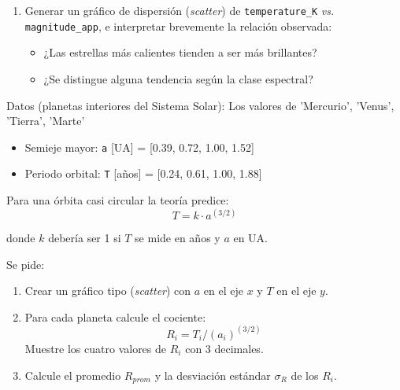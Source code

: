 \documentclass[10pt]{article}
\begin{document}
\begin{tcolorbox}[title={Pregunta 2 – Mini-catálogo HIPPARCOS}]
\begin{enumerate}
    \item Generar un gráfico de dispersión (\textit{scatter}) de \texttt{temperature\_K} \textit{vs.} \texttt{magnitude\_app}, e interpretar brevemente la relación observada:
    
    \begin{itemize}
        \item ¿Las estrellas más calientes tienden a ser más brillantes?
        \item ¿Se distingue alguna tendencia según la clase espectral?
    \end{itemize}
\end{enumerate}

\end{tcolorbox}



\begin{tcolorbox}[title={Pregunta 3 – Verificación directa de la ley de Kepler}]
Datos (planetas interiores del Sistema Solar): Los valores de 'Mercurio', 'Venus', 'Tierra', 'Marte'

\begin{itemize}
    \item Semieje mayor: \texttt{a} [UA]      = [0.39, 0.72, 1.00, 1.52]
    \item Periodo orbital: \texttt{T} [años]  = [0.24, 0.61, 1.00, 1.88]
\end{itemize}

Para una órbita casi circular la teoría predice:
\[
      T = k \cdot a^{(3/2)}
\]

donde $k$ debería ser 1 si $T$ se mide en años y $a$ en UA.

   Se pide:
\begin{enumerate}
    \item Crear un gráfico tipo (\textit{scatter}) con $a$ en el eje $x$ y $T$ en el eje $y$.
    
    \item Para cada planeta calcule el cociente:
    \[
    R_i = T_i / (a_i)^{(3/2)}
    \]
    Muestre los cuatro valores de $R_i$ con 3 decimales.

    \item Calcule el promedio $R_{prom}$ y la desviación estándar $\sigma_R$ de los $R_i$.
\end{enumerate}
\end{tcolorbox}
\end{document}
